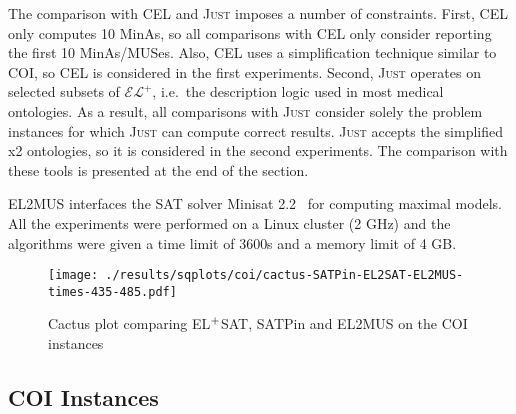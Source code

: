 \documentclass{llncs}
\newcommand{\tn}{\textnormal}
\newcommand{\fml}[1]{{\mathcal{#1}}}
\newcommand{\elplus}{$\fml{EL}^{+}$\xspace}
\newcommand{\elsat}{EL$^{\tn{+}}$SAT\xspace}
\newcommand{\just}{\textsc{Just}\xspace}
\begin{document}
The comparison with CEL and \just imposes a number of constraints.
First, CEL only computes 10 MinAs, so all comparisons with
CEL only consider reporting the first 10 MinAs/MUSes. Also, CEL uses
a simplification technique similar to COI, so CEL is considered in the first
 experiments.
Second, \just operates on selected subsets of \elplus, i.e.\ the
description logic used in most medical ontologies. As a result, all
comparisons with \just consider solely the problem instances for which
\just can compute correct results. \just accepts the simplified x2 ontologies, 
so it is considered in the second experiments.
The comparison with these tools is presented at the end of the section.

EL2MUS interfaces the SAT solver Minisat 2.2~\cite{een-sat03} for computing maximal models. All the experiments were performed on a Linux cluster (2 GHz) and the 
algorithms were given a time limit of 3600s and a memory limit of 4
GB.



\begin{figure}[t]
  \centering
  \texttt{[image: ./results/sqplots/coi/cactus-SATPin-EL2SAT-EL2MUS-times-435-485.pdf]} \caption{Cactus plot comparing \elsat, SATPin and
    EL2MUS on the COI instances} \label{fig:cactus-coi}
\end{figure}


\subsection{COI Instances}
\end{document}
